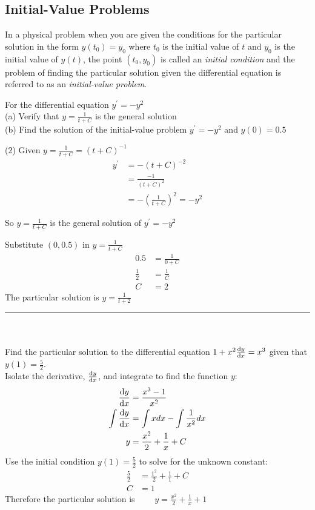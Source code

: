 \subsection*{Initial-Value Problems}
In a physical problem when you are given the conditions for the particular solution in the form $y (t_{0}) =y_{0}$ where $t_{0}$ is the initial value of $t$ and $y_{0}$ is the initial value of $y (t)$, the point $\left (t_{0} ,y_{0}\right )$ is called an \emph{initial condition} and the
problem of finding the particular solution given the differential equation is referred to as an \emph{initial-value problem}. 

\example For the differential equation $y^{ \prime } = -y^{2}$ \medskip\\
(a) Verify that $y =\frac{1}{t +C}$ is the general solution \\
(b) Find the solution of the initial-value problem $y^{ \prime } = -y^{2}$ and $y \left (0\right ) =0.5$ \\
\solution
\begin{tasks}(2)
\task Given $y =\frac{1}{t +C} =\left (t +C\right )^{ -1}$
\begin{align*}y^{ \prime } &    =  -\left (t +C\right )^{ -2} \\
 &    = \frac{ -1}{\left (t +C\right )^{2}} \\
 &    =  -\left(\frac{1}{t +C}\right)^{2} = -y^{2}\end{align*}

So $y =\frac{1}{t +C}$ is the general solution of $y^{ \prime } = -y^{2}$ 

\task Substitute $\left (0 ,0.5\right )$ in $y =\frac{1}{t +C}$
\begin{align*}0.5 &    = \frac{1}{0 +C} \\
\frac{1}{2} &    = \frac{1}{C} \\
C &    = 2\end{align*}
The particular solution is $y =\frac{1}{t +2}$
\end{tasks}
\rule{6.8cm}{0.5pt}\\
\examq\\ Find the particular solution to the differential equation $1+x^2\frac{\mathrm{d}y}{\mathrm{d}x}=x^3$ given that $y(1)=\frac{5}{2}$.\\
\solution Isolate the derivative, $\frac{\mathrm{d}y}{\mathrm{d}x}$, and integrate to find the function $y$:\\
\begin{align*}
\frac{\mathrm{d}y}{\mathrm{d}x}&=\frac{x^3-1}{x^2}\\
\int\frac{\mathrm{d}y}{\mathrm{d}x}&=\int xdx-\int\frac{1}{x^2}dx\\	
y&=\frac{x^2}{2}+\frac{1}{x}+C
\end{align*}
Use the initial condition $y(1)=\frac{5}{2}$ to solve for the unknown constant:\\
	\begin{align*}\frac{5}{2}&=\frac{1^2}{2}+\frac{1}{1}+C\\
	C&=1
	\end{align*}
Therefore the particular solution is $\qquad\displaystyle y=\frac{x^2}{2}+\frac{1}{x}+1$

